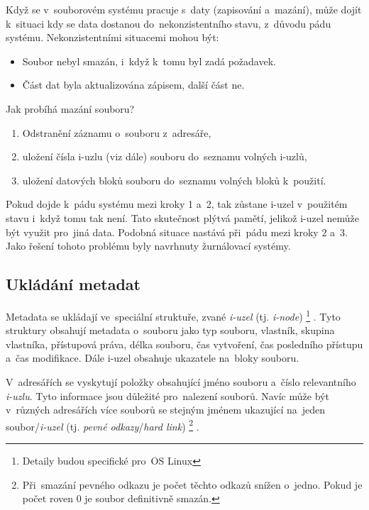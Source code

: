 Když se v~souborovém systému pracuje s~daty (zapisování a~mazání), může dojít k~situaci kdy se data dostanou do~nekonzistentního stavu, z~důvodu pádu systému. Nekonzistentními situacemi mohou být:

\begin{itemize}[noitemsep]
	\item Soubor nebyl smazán, i~když k~tomu byl zadá požadavek.
	\item Část dat byla aktualizována zápisem, další část ne.
\end{itemize}

Jak probíhá mazání souboru?

\begin{enumerate}[noitemsep]
	\item Odstranění záznamu o~souboru z~adresáře,
	\item uložení čísla i-uzlu (viz dále) souboru do~seznamu volných i-uzlů,
	\item uložení datových bloků souboru do~seznamu volných bloků k~použití.
\end{enumerate}

Pokud dojde k~pádu systému mezi kroky 1 a~2, tak zůstane i-uzel v~použitém stavu i~když tomu tak není. Tato skutečnost plýtvá pamětí, jelikož i-uzel nemůže být využit pro~jiná data. Podobná situace nastává při~pádu mezi kroky 2 a~3. Jako řešení tohoto problému byly navrhnuty žurnálovací systémy.

\subsection{Ukládání metadat}

Metadata se ukládají ve~speciální struktuře, zvané \emph{i-uzel} (tj. \emph{i-node})%
\footnote{Detaily budou specifické pro~OS Linux} %
. Tyto struktury obsahují metadata o~souboru jako typ souboru, vlastník, skupina vlastníka, přístupová práva, délka souboru, čas vytvoření, čas posledního přístupu a~čas modifikace. Dále i-uzel obsahuje ukazatele na~bloky souboru.

V~adresářích se vyskytují položky obsahující jméno souboru a~číslo relevantního \emph{i-uzlu}. Tyto informace jsou důležité pro~nalezení souborů. Navíc může být v~různých adresářích více souborů se stejným jménem ukazující na~jeden soubor/\emph{i-uzel} (tj. \emph{pevné odkazy}/\emph{hard link})%
\footnote{Při~smazání pevného odkazu je počet těchto odkazů snížen o~jedno. Pokud je počet roven 0 je soubor definitivně smazán.}%
.

